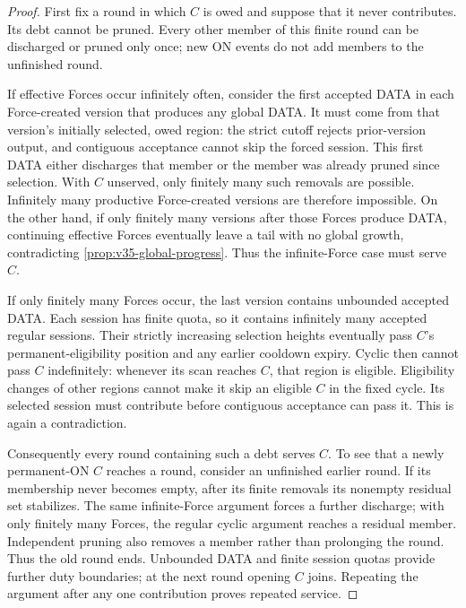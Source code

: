 \begin{proof}
First fix a round in which $C$ is owed and suppose that it never
contributes. Its debt cannot be pruned. Every other member of this
finite round can be discharged or pruned only once; new ON events do
not add members to the unfinished round.

If effective Forces occur infinitely often, consider the first accepted
DATA in each Force-created version that produces any global DATA.
It must come from that version's initially selected, owed region: the
strict cutoff rejects prior-version output, and contiguous acceptance
cannot skip the forced session. This first DATA either discharges that
member or the member was already pruned since selection. With $C$
unserved, only finitely many such removals are possible. Infinitely many
productive Force-created versions are therefore impossible. On the
other hand, if only finitely many versions after those Forces produce
DATA, continuing effective Forces eventually leave a tail with no
global growth, contradicting \cref{prop:v35-global-progress}. Thus
the infinite-Force case must serve $C$.

If only finitely many Forces occur, the last version contains
unbounded accepted DATA. Each session has finite quota, so it contains
infinitely many accepted regular sessions. Their strictly increasing
selection heights eventually pass $C$'s permanent-eligibility position
and any earlier cooldown expiry. Cyclic  then cannot pass
$C$ indefinitely: whenever its scan reaches $C$, that region is
eligible. Eligibility changes of other regions cannot make it skip
an eligible $C$ in the fixed cycle. Its selected session must contribute
before contiguous acceptance can pass it. This is again a contradiction.

Consequently every round containing such a debt serves $C$. To see
that a newly permanent-ON $C$ reaches a round, consider an unfinished
earlier round. If its membership never becomes empty, after its finite
removals its nonempty residual set stabilizes. The same infinite-Force
argument forces a further discharge; with only finitely many Forces,
the regular cyclic argument reaches a residual member. Independent
pruning also removes a member rather than prolonging the round. Thus
the old round ends. Unbounded DATA and finite session quotas provide
further duty boundaries; at the next round opening $C$ joins. Repeating
the argument after any one contribution proves repeated service.
\end{proof}

